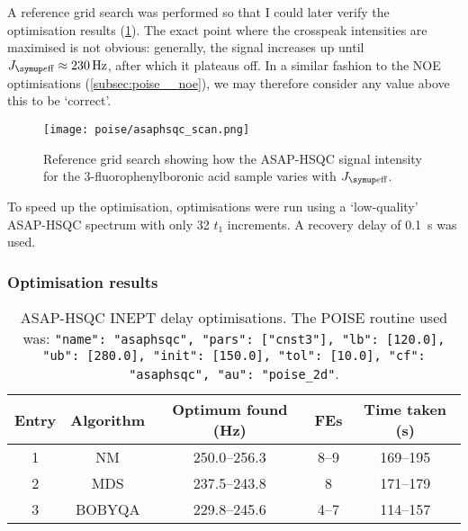A reference grid search was performed so that I could later verify the optimisation results (\cref{fig:asaphsqc_scan}).
The exact point where the crosspeak intensities are maximised is not obvious: generally, the signal increases up until $\Jeff \approx \qty{230}{\Hz}$, after which it plateaus off.
In a similar fashion to the NOE optimisations (\cref{subsec:poise__noe}), we may therefore consider any value above this to be `correct'.

\begin{figure}[htb]
    \centering
    \texttt{[image: poise/asaphsqc\_scan.png]}%
    \caption[Reference grid search for ASAP-HSQC excitation delay]{
        Reference grid search showing how the ASAP-HSQC signal intensity for the 3-fluorophenylboronic acid sample varies with $\Jeff$.
    }
    \label{fig:asaphsqc_scan}
\end{figure}

To speed up the optimisation, optimisations were run using a `low-quality' ASAP-HSQC spectrum with only 32 $t_1$ increments.
A recovery delay of \qty{0.1}{\s} was used.

\subsubsection{Optimisation results}

\begin{table}[htb]
    \centering
    \begin{tabular}{ccccc}
        \toprule
        Entry & Algorithm & Optimum found (\unit{\Hz}) & FEs  & Time taken (\unit{\s}) \\
        \midrule
        1     & NM        & 250.0--256.3            & 8--9 & 169--195             \\
        2     & MDS       & 237.5--243.8            & 8    & 171--179             \\
        3     & BOBYQA    & 229.8--245.6            & 4--7 & 114--157             \\
        \bottomrule
    \end{tabular}
    \caption[ASAP-HSQC INEPT delay optimisations]{
        ASAP-HSQC INEPT delay optimisations.
        The POISE routine used was: \texttt{{"name": "asaphsqc", "pars": ["cnst3"], "lb": [120.0], "ub": [280.0], "init": [150.0], "tol": [10.0], "cf": "asaphsqc", "au": "poise_2d"}}.
    }
    \label{tbl:poise_asaphsqc}
\end{table}

